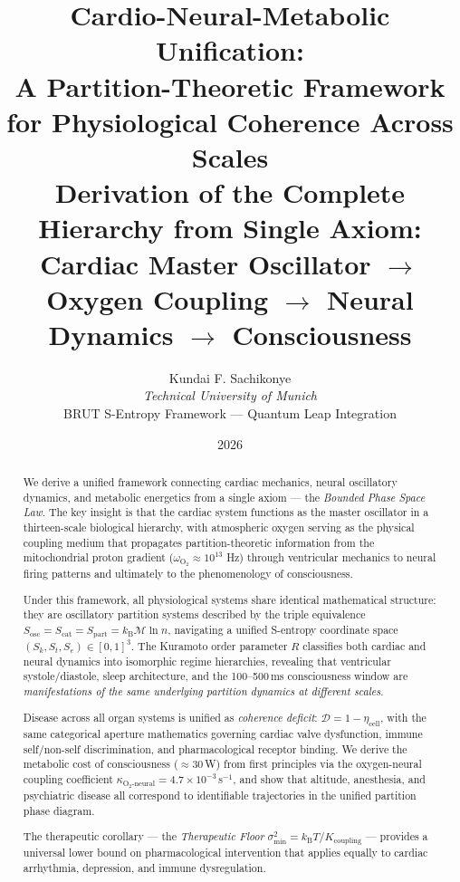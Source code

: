 \documentclass[12pt,a4paper]{article}
\title{\textbf{Cardio-Neural-Metabolic Unification:\\
A Partition-Theoretic Framework for Physiological Coherence Across Scales}\\[0.5em]
\large Derivation of the Complete Hierarchy from Single Axiom:\\
Cardiac Master Oscillator $\longrightarrow$ Oxygen Coupling $\longrightarrow$ Neural Dynamics $\longrightarrow$ Consciousness}
\author{Kundai F. Sachikonye\\
\textit{Technical University of Munich}\\[0.3em]
\small BRUT S-Entropy Framework — Quantum Leap Integration}
\date{2026}
\theoremstyle{definition}
\newcommand{\Sosc}{S_{\text{osc}}}
\newcommand{\Scat}{S_{\text{cat}}}
\newcommand{\Spart}{S_{\text{part}}}
\newcommand{\kB}{k_{\text{B}}}
\newcommand{\kBT}{k_{\text{B}}T}
\begin{document}
\maketitle

\begin{abstract}
We derive a unified framework connecting cardiac mechanics, neural oscillatory dynamics,
and metabolic energetics from a single axiom — the \emph{Bounded Phase Space Law}.
The key insight is that the cardiac system functions as the master oscillator in a
thirteen-scale biological hierarchy, with atmospheric oxygen serving as the physical
coupling medium that propagates partition-theoretic information from the mitochondrial
proton gradient ($\omega_{\text{O}_2} \approx 10^{13}$ Hz) through ventricular mechanics
to neural firing patterns and ultimately to the phenomenology of consciousness.

Under this framework, all physiological systems share identical mathematical structure:
they are oscillatory partition systems described by the triple equivalence
$\Sosc = \Scat = \Spart = \kB \mathcal{M} \ln n$, navigating a unified
S-entropy coordinate space $(S_k, S_t, S_e) \in [0,1]^3$. The Kuramoto order parameter
$R$ classifies both cardiac and neural dynamics into isomorphic regime hierarchies,
revealing that ventricular systole/diastole, sleep architecture, and the
100--500\,ms consciousness window are \emph{manifestations of the same underlying
partition dynamics at different scales}.

Disease across all organ systems is unified as \emph{coherence deficit}:
$\mathcal{D} = 1 - \eta_{\text{cell}}$, with the same categorical aperture mathematics
governing cardiac valve dysfunction, immune self/non-self discrimination, and
pharmacological receptor binding. We derive the metabolic cost of consciousness
($\approx 30$\,W) from first principles via the oxygen-neural coupling coefficient
$\kappa_{\text{O}_2\text{-neural}} = 4.7 \times 10^{-3}$\,s$^{-1}$, and show that
altitude, anesthesia, and psychiatric disease all correspond to identifiable
trajectories in the unified partition phase diagram.

The therapeutic corollary — the \emph{Therapeutic Floor}
$\sigma^2_{\min} = \kBT / K_{\text{coupling}}$ — provides a universal lower bound
on pharmacological intervention that applies equally to cardiac arrhythmia,
depression, and immune dysregulation.
\end{abstract}

\tableofcontents
\end{document}
